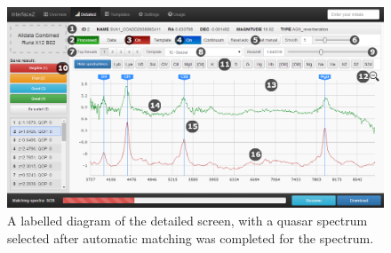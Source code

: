 \documentclass[titlesmallcaps, examinerscopy, copyrightpage]{uqthesis}
\begin{document}
\begin{figure}[ht!]
\includegraphics[width=1\textwidth]{images/detailed2.png} 
\centering
\caption{A labelled diagram of the detailed screen, with a quasar spectrum selected after automatic matching was completed for the spectrum.}
\label{fig:detailed}
\end{figure}
\end{document}
